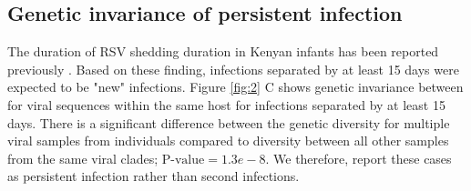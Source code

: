 \documentclass{article}
\begin{document}
\subsection{Genetic invariance of persistent infection}
The duration of RSV shedding duration in Kenyan infants has been reported previously
\cite{okiro2010duration}.
Based on these finding, infections separated by at least 15 days were expected to be "new" infections. 
Figure \ref{fig:2} C
shows genetic invariance between for viral sequences within the same host for infections separated by at least 15 days. 
There is a significant difference between the genetic diversity for multiple viral samples from individuals compared to diversity between all other samples from the same viral clades; $\text{P-value} = 1.3e-8$.
We therefore, report these cases as persistent infection rather than second infections.
\end{document}
